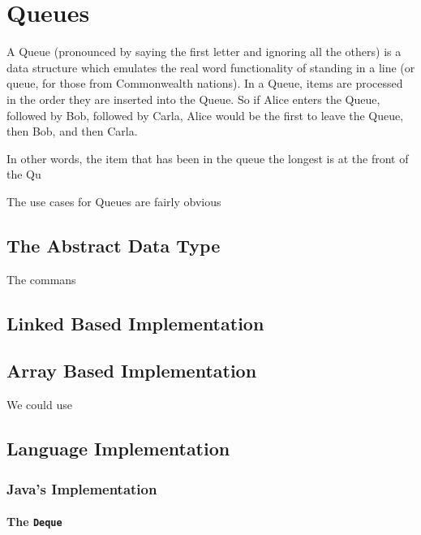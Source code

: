 
\chapter{Queues}
\label{chap-queue}

A Queue (pronounced by saying the first letter and ignoring all the others) is a data structure which emulates the real word functionality of standing in a line (or queue, for those from Commonwealth nations).  
In a Queue, items are processed in the order they are inserted into the Queue.  So if Alice enters the Queue, followed by Bob, followed by Carla, Alice would be the first to leave the Queue, then Bob, and then Carla.

In other words, the item that has been in the queue the longest is at the front of the Qu

The use cases for Queues are fairly obvious

\section{The Abstract Data Type}
The commans

\section{Linked Based Implementation} 
\section{Array Based Implementation}
We could use 

\section{Language Implementation}
\subsection{Java's Implementation}
\subsubsection{The \texttt{Deque}}